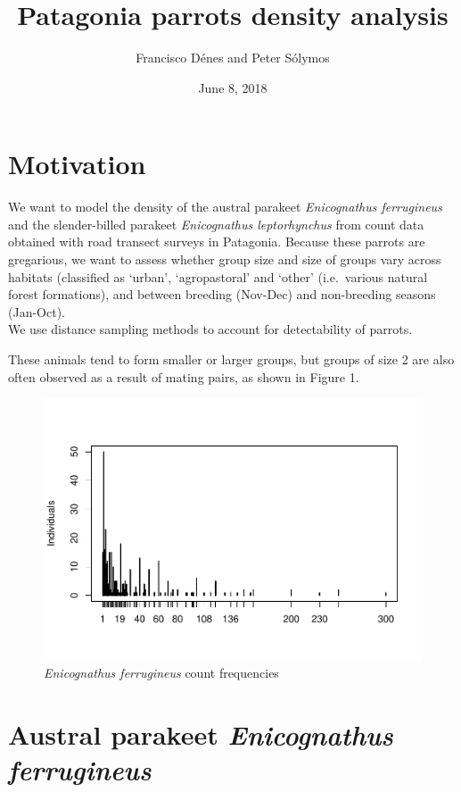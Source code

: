\documentclass[]{article}
\title{Patagonia parrots density analysis}
\author{Francisco Dénes and Peter Sólymos}
\date{June 8, 2018}
\begin{document}
\maketitle

\section{Motivation}\label{motivation}

We want to model the density of the austral parakeet \emph{Enicognathus
ferrugineus} and the slender-billed parakeet \emph{Enicognathus
leptorhynchus} from count data obtained with road transect surveys in
Patagonia. Because these parrots are gregarious, we want to assess
whether group size and size of groups vary across habitats (classified
as `urban', `agropastoral' and `other' (i.e.~various natural forest
formations), and between breeding (Nov-Dec) and non-breeding seasons
(Jan-Oct).\\
We use distance sampling methods to account for detectability of
parrots.

These animals tend to form smaller or larger groups, but groups of size
2 are also often observed as a result of mating pairs, as shown in
Figure 1.

\begin{figure}[H]
\includegraphics{Patagonia_parrots_density_analysis_files/figure-latex/unnamed-chunk-1-1} \caption{\textit{Enicognathus ferrugineus} count frequencies}\label{fig:unnamed-chunk-1}
\end{figure}

\section{\texorpdfstring{Austral parakeet \emph{Enicognathus
ferrugineus}}{Austral parakeet Enicognathus ferrugineus}}\label{austral-parakeet-enicognathus-ferrugineus}
\end{document}
